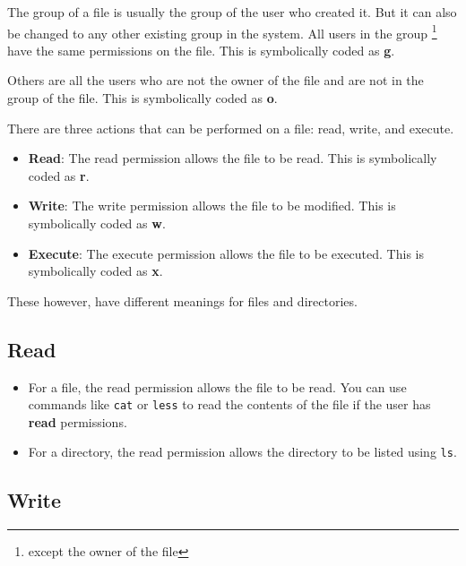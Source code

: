 \begin{definition}[Group]
  The group of a file is usually the group of the user who created it.
  But it can also be changed to any other existing group in the system.
  All users in the group
  \footnote{
    except the owner of the file
  }
  have the same permissions on the file.
  This is symbolically coded as \textbf{g}.
\end{definition}

\begin{definition}[Others]
  Others are all the users who are not the owner of the file and are not in the group of the file.
  This is symbolically coded as \textbf{o}.
\end{definition}

There are three actions that can be performed on a file: read, write, and execute.

\begin{itemize}
  \item \textbf{Read}: The read permission allows the file to be read.
    This is symbolically coded as \textbf{r}.
  \item \textbf{Write}: The write permission allows the file to be modified.
    This is symbolically coded as \textbf{w}.
  \item \textbf{Execute}: The execute permission allows the file to be executed.
    This is symbolically coded as \textbf{x}.
\end{itemize}

These however, have different meanings for files and directories.

\subsection{Read}

\begin{itemize}
  \item For a file, the read permission allows the file to be read.
    You can use commands like \lstinline|cat| or \lstinline|less| to read the contents of the file if the user has \textbf{read} permissions.
  \item For a directory, the read permission allows the directory to be listed using \lstinline|ls|.
\end{itemize}

\subsection{Write}

